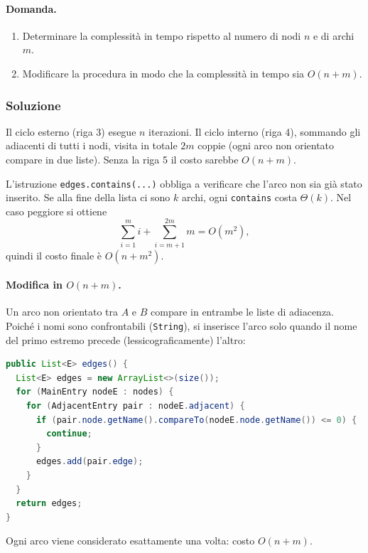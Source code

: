 \paragraph{Domanda.}
\begin{enumerate}
	\item Determinare la complessità in tempo rispetto al numero di nodi $n$ e di archi $m$.
	\item Modificare la procedura in modo che la complessità in tempo sia $O(n+m)$.
\end{enumerate}

\subsubsection*{Soluzione}

Il ciclo esterno (riga 3) esegue $n$ iterazioni. Il ciclo interno (riga 4), sommando gli
adiacenti di tutti i nodi, visita in totale $2m$ coppie (ogni arco non orientato compare
in due liste). Senza la riga 5 il costo sarebbe $O(n+m)$.

L'istruzione \texttt{edges.contains(...)} obbliga a verificare che l'arco non sia già stato
inserito. Se alla fine della lista ci sono $k$ archi, ogni \texttt{contains} costa $\Theta(k)$.
Nel caso peggiore si ottiene
\[
\sum_{i=1}^{m} i + \sum_{i=m+1}^{2m} m = O(m^2),
\]
quindi il costo finale è $O(n + m^2)$.

\paragraph{Modifica in $O(n+m)$.}
Un arco non orientato tra $A$ e $B$ compare in entrambe le liste di adiacenza. Poiché i nomi
sono confrontabili (\texttt{String}), si inserisce l'arco solo quando il nome del primo
estremo precede (lessicograficamente) l'altro:

\begin{lstlisting}[language=Java, caption={Versione ottimizzata di \texttt{edges()}}]
public List<E> edges() {
  List<E> edges = new ArrayList<>(size());
  for (MainEntry nodeE : nodes) {
    for (AdjacentEntry pair : nodeE.adjacent) {
      if (pair.node.getName().compareTo(nodeE.node.getName()) <= 0) {
        continue;
      }
      edges.add(pair.edge);
    }
  }
  return edges;
}
\end{lstlisting}

Ogni arco viene considerato esattamente una volta: costo $O(n+m)$.


